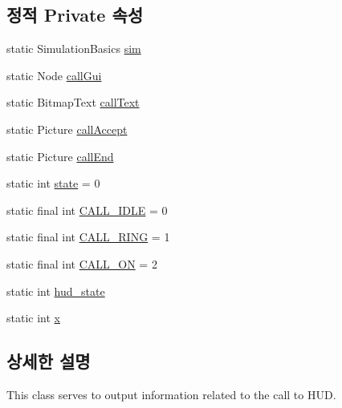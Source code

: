 \subsection*{정적 Private 속성}
\begin{DoxyCompactItemize}
\item 
static Simulation\+Basics \hyperlink{classkr_1_1ac_1_1kookmin_1_1cs_1_1call_1_1_call_hud_ad7b1172b6ece225becb5a5b6ca8ad291}{sim}
\item 
static Node \hyperlink{classkr_1_1ac_1_1kookmin_1_1cs_1_1call_1_1_call_hud_a04c754bf3f77ab819160e0769e5ef468}{call\+Gui}
\item 
static Bitmap\+Text \hyperlink{classkr_1_1ac_1_1kookmin_1_1cs_1_1call_1_1_call_hud_ad019cdb0ca0d81309a6f6013b3e1fbc4}{call\+Text}
\item 
static Picture \hyperlink{classkr_1_1ac_1_1kookmin_1_1cs_1_1call_1_1_call_hud_a865f02912a148dba841040f73f35afec}{call\+Accept}
\item 
static Picture \hyperlink{classkr_1_1ac_1_1kookmin_1_1cs_1_1call_1_1_call_hud_a12d3cd83d655c78a76ed3d340d106221}{call\+End}
\item 
static int \hyperlink{classkr_1_1ac_1_1kookmin_1_1cs_1_1call_1_1_call_hud_a205351e41055a51d9b1d33ee0c6d84f1}{state} = 0
\item 
static final int \hyperlink{classkr_1_1ac_1_1kookmin_1_1cs_1_1call_1_1_call_hud_acc23c947c0a464d1c09b04666057e8fc}{C\+A\+L\+L\+\_\+\+I\+D\+L\+E} = 0
\item 
static final int \hyperlink{classkr_1_1ac_1_1kookmin_1_1cs_1_1call_1_1_call_hud_a2dd996d4b86346a0bdc0ae462d94cf19}{C\+A\+L\+L\+\_\+\+R\+I\+N\+G} = 1
\item 
static final int \hyperlink{classkr_1_1ac_1_1kookmin_1_1cs_1_1call_1_1_call_hud_a78497626e7b91b6242225fb43517868e}{C\+A\+L\+L\+\_\+\+O\+N} = 2
\item 
static int \hyperlink{classkr_1_1ac_1_1kookmin_1_1cs_1_1call_1_1_call_hud_af5388605062cf82753266c23f663e2eb}{hud\+\_\+state}
\item 
static int \hyperlink{classkr_1_1ac_1_1kookmin_1_1cs_1_1call_1_1_call_hud_a5fb59820575dd36c90906279886188f4}{x}
\end{DoxyCompactItemize}


\subsection{상세한 설명}
This class serves to output information related to the call to H\+U\+D. 

